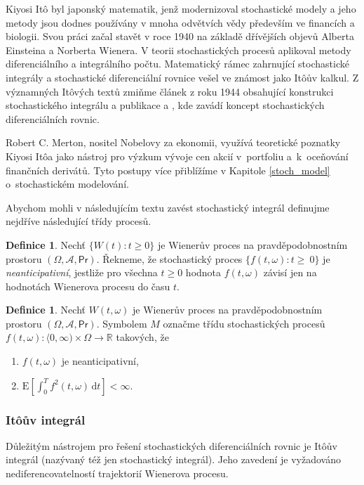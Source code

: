 \documentclass[a4paper,12pt]{report}
\theoremstyle{definition} \newtheorem{definice}[veta]{Definice}
\theoremstyle{remark}
\begin{document}
Kiyosi It\^o byl japonský matematik, jenž modernizoval stochastické modely a jeho metody jsou dodnes používány v mnoha odvětvích vědy především ve financích a biologii.
Svou práci začal stavět v roce 1940 na základě dřívějších objevů Alberta Einsteina a Norberta Wienera.
V teorii stochastických procesů aplikoval metody diferenciálního a integrálního počtu.
Matematický rámec zahrnující stochastické integrály a stochastické diferenciální rovnice vešel ve známost jako It\^oův kalkul.
Z významných It\^ových textů zmiňme 
článek \cite{ito1944} z roku 1944 obsahující konstrukci stochastického integrálu
a publikace \cite{ito1946} a
\cite{ito1951stochastic}, kde zavádí koncept stochastických diferenciálních rovnic.

Robert C. Merton, nositel Nobelovy za ekonomii, využívá teoretické poznatky Kiyosi It\^oa jako nástroj pro výzkum vývoje cen akcií v~portfoliu a~k~oceňování finančních derivátů.
Tyto postupy více přiblížíme v Kapitole \ref{stoch_model} o~stochastickém modelování.

Abychom mohli v následujícím textu zavést stochastický integrál definujme nejdříve následující třídy procesů.
\begin{definice}
Nechť $\{W(t):t\ge0\}$ je Wienerův proces na pravděpodobnostním prostoru $(\Omega,\mathcal{A},\mathsf{Pr})$.
Řekneme, že stochastický proces $\{f(t,\omega):t\ge~0\}$ je \textit{neanticipativní}, jestliže pro všechna $t\ge0$ hodnota $f(t,\omega)$ závisí jen na hodnotách Wienerova procesu do času $t$.
\end{definice}

\begin{definice}\label{M}
Nechť $W(t,\omega)$ je Wienerův proces na pravděpodobnostním prostoru $(\Omega,\mathcal{A},\mathsf{Pr})$.
Symbolem $M$ označme třídu stochastických procesů \linebreak$f(t,\omega):\langle0,\infty)\times\Omega\to\mathbb R$ takových, že
\begin{enumerate}
\item $f(t,\omega)$ je neanticipativní, 
\item $\text{E}\left[\int_0^Tf^2(t,\omega)\,\mathrm{d}t\right]<\infty.$ 
\end{enumerate}
\end{definice}

\subsubsection{It\^oův integrál}\label{Ito_integral}
Důležitým nástrojem pro řešení stochastických diferenciálních rovnic je It\^oův integrál (nazývaný též jen stochastický integrál).
Jeho zavedení je vyžadováno nediferencovatelností trajektorií Wienerova procesu.
\end{document}
